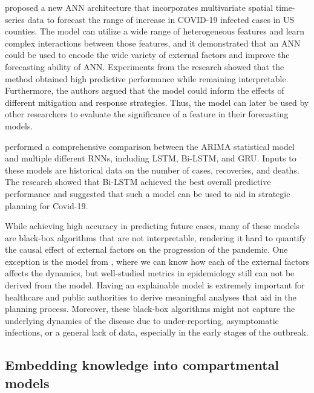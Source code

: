 \citeauthor{ramchandaniDeepCOVIDNetInterpretableDeep2020} \cite{ramchandaniDeepCOVIDNetInterpretableDeep2020} proposed a new \gls{ANN} architecture that incorporates multivariate spatial time-series data to forecast the range of increase in COVID-19 infected cases in \gls{US} counties.
The model can utilize a wide range of heterogeneous features and learn complex interactions between those features, and it demonstrated that an \gls{ANN} could be used to encode the wide variety of external factors and improve the forecasting ability of \gls{ANN}.
Experiments from the research showed that the method obtained high predictive performance while remaining interpretable.
Furthermore, the authors argued that the model could inform the effects of different mitigation and response strategies.
Thus, the model can later be used by other researchers to evaluate the significance of a feature in their forecasting models.

\citeauthor{shahidPredictionsCOVID19Deep2020} \cite{shahidPredictionsCOVID19Deep2020} performed a comprehensive comparison between the \gls{ARIMA} statistical model and multiple different \glspl{RNN}, including \gls{LSTM}, \gls{Bi-LSTM}, and \gls{GRU}.
Inputs to these models are historical data on the number of cases, recoveries, and deaths.
The research showed that \gls{Bi-LSTM} achieved the best overall predictive performance and suggested that such a model can be used to aid in strategic planning for Covid-19.

While achieving high accuracy in predicting future cases, many of these models are black-box algorithms that are not interpretable, rendering it hard to quantify the causal effect of external factors on the progression of the pandemic.
One exception is the model from \cite{ramchandaniDeepCOVIDNetInterpretableDeep2020}, where we can know how each of the external factors affects the dynamics, but well-studied metrics in epidemiology still can not be derived from the model.
Having an explainable model is extremely important for healthcare and public authorities to derive meaningful analyses that aid in the planning process.
Moreover, these black-box algorithms might not capture the underlying dynamics of the disease due to under-reporting, asymptomatic infections, or a general lack of data, especially in the early stages of the outbreak.

\subsection{Embedding knowledge into compartmental models}


